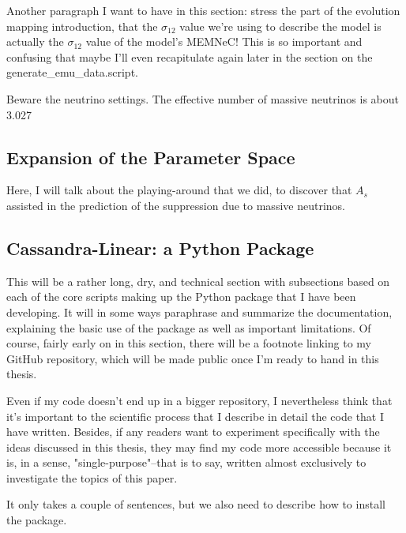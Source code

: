 \documentclass[11pt]{article}
\begin{document}
Another paragraph I want to have in this section: stress the part of the evolution mapping introduction, that the $\sigma_{12}$ value we're using to describe the model is actually the $\sigma_{12}$ value of the model's MEMNeC! This is so important and confusing that maybe I'll even recapitulate again later in the section on the generate\_emu\_data.script.


Beware the neutrino settings. The effective number of massive neutrinos is about 3.027

\begin{centering}
\section{Expansion of the Parameter Space}
\end{centering}

Here, I will talk about the playing-around that we did, to discover that $A_s$ assisted in the prediction of the suppression due to massive neutrinos.

\begin{centering}
\section{Cassandra-Linear: a Python Package}
\end{centering}

This will be a rather long, dry, and technical section with subsections based on each of the core scripts making up the Python package that I have been developing. It will in some ways paraphrase and summarize the documentation, explaining the basic use of the package as well as important limitations. Of course, fairly early on in this section, there will be a footnote linking to my GitHub repository, which will be made public once I'm ready to hand in this thesis.

Even if my code doesn't end up in a bigger repository, I nevertheless think that it's important to the scientific process that I describe in detail the code that I have written. Besides, if any readers want to experiment specifically with the ideas discussed in this thesis, they may find my code more accessible because it is, in a sense, "single-purpose"--that is to say, written almost exclusively to investigate the topics of this paper.

It only takes a couple of sentences, but we also need to describe how to install the package.
\end{document}
